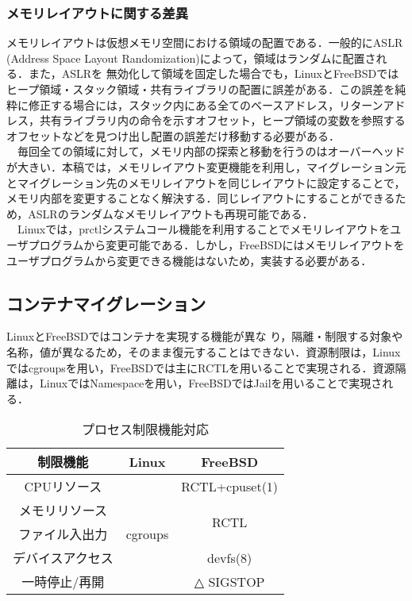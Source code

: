 \documentclass{ipsjpapers}
\begin{document}
\subsubsection{メモリレイアウトに関する差異}
メモリレイアウトは仮想メモリ空間における領域の配置である．一般的にASLR (Address Space
Layout Randomization)によって，領域はランダムに配置される．また，ASLRを
無効化して領域を固定した場合でも，LinuxとFreeBSDではヒープ領域・スタック領域・共有ライブラリの配置に誤差がある．この誤差を純粋に修正する場合には，スタック内にある全てのベースアドレス，リターンアドレス，共有ライブラリ内の命令を示すオフセット，ヒープ領域の変数を参照するオフセットなどを見つけ出し配置の誤差だけ移動する必要がある．\\
　毎回全ての領域に対して，メモリ内部の探索と移動を行うのはオーバーヘッドが大きい．本稿では，メモリレイアウト変更機能を利用し，マイグレーション元とマイグレーション先のメモリレイアウトを同じレイアウトに設定することで，メモリ内部を変更することなく解決する．同じレイアウトにすることができるため，ASLRのランダムなメモリレイアウトも再現可能である．\\
　Linuxでは，prctlシステムコール機能を利用することでメモリレイアウトをユーザプログラムから変更可能である．しかし，FreeBSDにはメモリレイアウトをユーザプログラムから変更できる機能はないため，実装する必要がある．

\subsection{コンテナマイグレーション}
\label{sec:CM}
LinuxとFreeBSDではコンテナを実現する機能が異な
り，隔離・制限する対象や名称，値が異なるため，そのまま復元することはできない．資源制限は，Linuxではcgroupsを用い，FreeBSDでは主にRCTLを用いることで実現される．資源隔離は，LinuxではNamespaceを用い，FreeBSDではJailを用いることで実現される．

\begin{table}[t]
  \caption{プロセス制限機能対応}
  \label{tb:limit}
  \vspace{0.5em}
  \begin{center}
  \begin{tabular}{|c|c|c|} \hline
    制限機能 & Linux & FreeBSD \\ \hline \hline
    CPUリソース & \multirow{5}{*}{cgroups} &  RCTL+cpuset(1) \\ \cline{1-1} \cline{3-3}
    メモリリソース &  &  \multirow{2}{*}{RCTL} \\ \cline{1-1}
    ファイル入出力 &  &  \\ \cline{1-1} \cline{3-3}
    デバイスアクセス &  & devfs(8) \\ \cline{1-1} \cline{3-3}
    一時停止/再開 &  & △ SIGSTOP \\ \hline
  \end{tabular}
\end{center}
\end{table}
\end{document}
